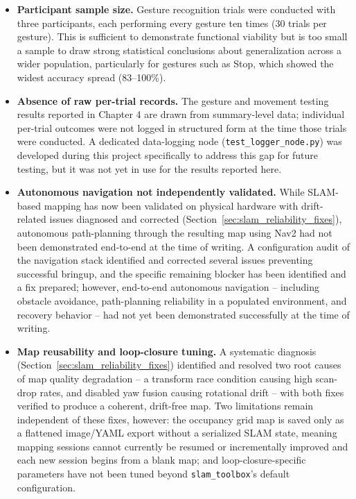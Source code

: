 \begin{itemize}
  \item \textbf{Participant sample size.} Gesture recognition trials were conducted
  with three participants, each performing every gesture ten times (30 trials per
  gesture). This is sufficient to demonstrate functional viability but is too small a
  sample to draw strong statistical conclusions about generalization across a wider
  population, particularly for gestures such as Stop, which showed the widest
  accuracy spread (83--100\%).

  \item \textbf{Absence of raw per-trial records.} The gesture and movement testing
  results reported in Chapter 4 are drawn from summary-level data; individual per-trial
  outcomes were not logged in structured form at the time those trials were conducted.
  A dedicated data-logging node (\texttt{test\_logger\_node.py}) was developed during
  this project specifically to address this gap for future testing, but it was not yet
  in use for the results reported here.

  \item \textbf{Autonomous navigation not independently validated.} While SLAM-based
mapping has now been validated on physical hardware with drift-related issues
diagnosed and corrected (Section~\ref{sec:slam_reliability_fixes}), autonomous
path-planning through the resulting map using Nav2 had not been demonstrated
end-to-end at the time of writing. A configuration audit of the navigation stack
identified and corrected several issues preventing successful bringup, and the
specific remaining blocker has been identified and a fix prepared; however,
end-to-end autonomous navigation -- including obstacle avoidance, path-planning
reliability in a populated environment, and recovery behavior -- had not yet been
demonstrated successfully at the time of writing.

  \item \textbf{Map reusability and loop-closure tuning.} A systematic diagnosis
(Section~\ref{sec:slam_reliability_fixes}) identified and resolved two root
causes of map quality degradation -- a transform race condition causing high
scan-drop rates, and disabled yaw fusion causing rotational drift -- with both
fixes verified to produce a coherent, drift-free map. Two limitations remain
independent of these fixes, however: the occupancy grid map is saved only as a
flattened image/YAML export without a serialized SLAM state, meaning mapping
sessions cannot currently be resumed or incrementally improved and each new
session begins from a blank map; and loop-closure-specific parameters have not
been tuned beyond \texttt{slam\_toolbox}'s default configuration.


\end{itemize}
